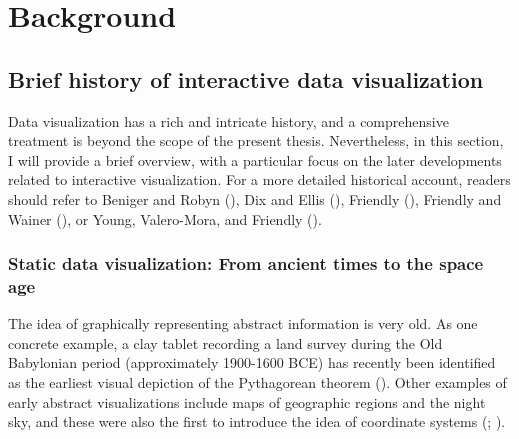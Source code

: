 \documentclass[
]{book}
\begin{document}
\chapter{Background}\label{litreview}

\section{Brief history of interactive data visualization}\label{brief-history}

Data visualization has a rich and intricate history, and a comprehensive treatment is beyond the scope of the present thesis. Nevertheless, in this section, I will provide a brief overview, with a particular focus on the later developments related to interactive visualization. For a more detailed historical account, readers should refer to Beniger and Robyn (), Dix and Ellis (), Friendly (), Friendly and Wainer (), or Young, Valero-Mora, and Friendly ().

\subsection{Static data visualization: From ancient times to the space age}\label{static-data-visualization-from-ancient-times-to-the-space-age}

The idea of graphically representing abstract information is very old. As one concrete example, a clay tablet recording a land survey during the Old Babylonian period (approximately 1900-1600 BCE) has recently been identified as the earliest visual depiction of the Pythagorean theorem (). Other examples of early abstract visualizations include maps of geographic regions and the night sky, and these were also the first to introduce the idea of coordinate systems (; ).
\end{document}
